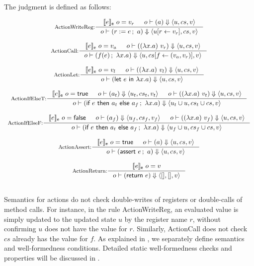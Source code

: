 \begin{definition}
  \label{def-semaction}
  The judgment  is defined as follows:
  \begin{center}
    \begin{math}
      \begin{array}{c}
        \inference[ActionWriteReg:]{\semexpr{e}{o} = v_r & \semact{o}{a}{u}{cs}{v}}
                  {\semact{o}{\actwrite{r}{e}{a}}{\stupd{u}{r}{v_r}}{cs}{v}} \\
        \mbox{} \\
        \inference[ActionCall:]{\semexpr{e}{o} = v_a & \semact{o}{(\lambda x.a)\ v_r}{u}{cs}{v}}
                  {\semact{o}{\actcall{x}{f}{e}{a}}{u}{\lblupd{cs}{f}{(v_a, v_r)}}{v}} \\
        \mbox{} \\
        \inference[ActionLet:]{\semexpr{e}{o} = v_l & \semact{o}{(\lambda x.a)\ v_l}{u}{cs}{v}}
                  {\semact{o}{\actlet{e}{x}{a}}{u}{cs}{v}} \\
        \mbox{} \\
        \inference[ActionIfElseT:]{\semexpr{e}{o} = \btrue{} &
          \semact{o}{a_t}{u_t}{cs_t}{v_t} &
          \semact{o}{(\lambda x.a)\ v_t}{u}{cs}{v}}
                  {\semact{o}{\actifelse{e}{a_t}{a_f}{x}{a}}{\sunion{u_t}{u}}{\sunion{cs_t}{cs}}{v}} \\
        \mbox{} \\
        \inference[ActionIfElseF:]{\semexpr{e}{o} = \bfalse{} &
          \semact{o}{a_f}{u_f}{cs_f}{v_f} &
          \semact{o}{(\lambda x.a)\ v_f}{u}{cs}{v}}
                  {\semact{o}{\actifelse{e}{a_t}{a_f}{x}{a}}{\sunion{u_f}{u}}{\sunion{cs_f}{cs}}{v}} \\
        \mbox{} \\
        \inference[ActionAssert:]{\semexpr{e}{o} = \btrue{} & \semact{o}{a}{u}{cs}{v}}
                  {\semact{o}{\actassert{e}{a}}{u}{cs}{v}} \\
        \mbox{} \\
        \inference[ActionReturn:]{\semexpr{e}{o} = v}
                  {\semact{o}{\actret{e}}{\emptymap{}}{\emptymap{}}{v}} \\
        \mbox{} \\
      \end{array}
    \end{math}
  \end{center}
\end{definition}

Semantics for actions do not check double-writes of registers or
double-calls of method calls. For instance, in the rule
ActionWriteReg, an evaluated value is simply updated to the updated
state $u$ by the register name $r$, without confirming $u$ does not
have the value for $r$. Similarly, ActionCall does not check $cs$
already has the value for $f$. As explained in
, we separately define semantics and
well-formedness conditions. Detailed static well-formedness checks and
properties will be discussed in .

